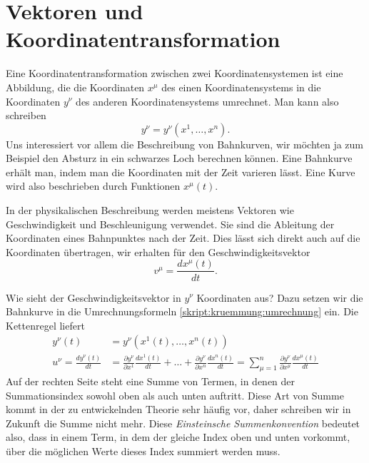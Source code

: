 \section{Vektoren und Koordinatentransformation}
Eine Koordinatentransformation zwischen zwei Koordinatensystemen ist
eine Abbildung, die die Koordinaten $x^\mu$ des einen Koordinatensystems
in die Koordinaten $y^\nu$ des anderen Koordinatensystems umrechnet.
Man kann also schreiben
\begin{equation}
y^{\nu}=y^{\nu}(x^1,\dots,x^n).
\label{skript:kruemmung:umrechnung}
\end{equation}
Uns interessiert vor allem die Beschreibung von Bahnkurven, wir möchten
ja zum Beispiel den Absturz in ein schwarzes Loch berechnen können.
Eine Bahnkurve erhält man, indem man die Koordinaten mit der Zeit
varieren lässt.
Eine Kurve wird also beschrieben durch Funktionen $x^\mu(t)$.

In der physikalischen Beschreibung werden meistens Vektoren wie
Geschwindigkeit und Beschleunigung verwendet.
Sie sind die Ableitung der Koordinaten eines Bahnpunktes nach
der Zeit.
Dies lässt sich direkt auch auf die Koordinaten übertragen,
wir erhalten für den Geschwindigkeitsvektor
\[
v^{\mu} = \frac{dx^\mu(t)}{dt}.
\]

Wie sieht der Geschwindigkeitsvektor in $y^{\nu}$ Koordinaten aus?
Dazu setzen wir die Bahnkurve in die Umrechnungsformeln
\eqref{skript:kruemmung:umrechnung} ein.
Die Kettenregel liefert
\begin{align*}
y^{\nu}(t)&=y^{\nu}(x^1(t),\dots,x^n(t))
\\
u^{\nu}
=
\frac{dy^{\nu}(t)}{dt}
&=
\frac{\partial y^{\nu}}{\partial x^1}\frac{dx^1(t)}{dt}
+\dots+
\frac{\partial y^{\nu}}{\partial x^n}\frac{dx^n(t)}{dt}
=
\sum_{\mu=1}^n
\frac{\partial y^{\nu}}{\partial x^{\mu}}\frac{dx^{\mu}(t)}{dt}
\end{align*}
Auf der rechten Seite steht eine Summe von Termen, in denen
der Summationsindex sowohl oben als auch unten auftritt.
Diese Art von Summe kommt in der zu entwickelnden Theorie sehr
häufig vor, daher schreiben wir in Zukunft die Summe nicht mehr.
Diese {\em Einsteinsche Summenkonvention} bedeutet also, dass in
einem Term, in dem der gleiche Index oben und unten vorkommt,
über die möglichen Werte dieses Index summiert werden muss.


